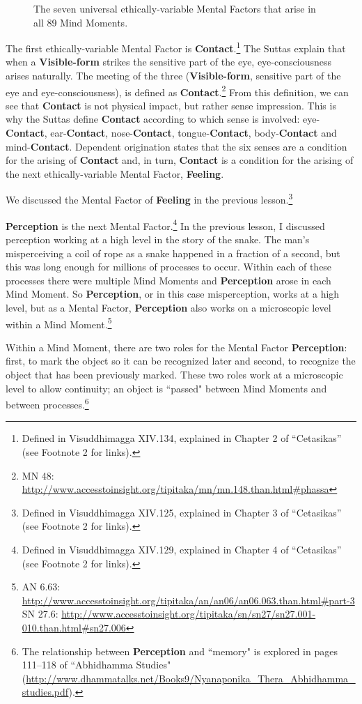 \begin{figure} [H]
\caption{The seven universal ethically-variable Mental Factors that arise in all 89 Mind Moments.}
\label{VarUni}
\end{figure}

The first ethically-variable Mental Factor is \textbf{Contact}.\footnote{Defined in Visuddhimagga XIV.134, explained in Chapter 2 of “Cetasikas” (see Footnote 2 for links).} The Suttas explain that when a \textbf{Visible-form} strikes the sensitive part of the eye, eye-consciousness arises naturally. The meeting of the three (\textbf{Visible-form}, sensitive part of the eye and eye-consciousness), is defined as \textbf{Contact}.\footnote{MN 48: \url{http://www.accesstoinsight.org/tipitaka/mn/mn.148.than.html\#phassa}} From this definition, we can see that \textbf{Contact} is not physical impact, but rather sense impression. This is why the Suttas define \textbf{Contact} according to which sense is involved: eye-\textbf{Contact}, ear-\textbf{Contact}, nose-\textbf{Contact}, tongue-\textbf{Contact}, body-\textbf{Contact} and mind-\textbf{Contact}. Dependent origination states that the six senses are a condition for the arising of \textbf{Contact} and, in turn, \textbf{Contact} is a condition for the arising of the next ethically-variable Mental Factor, \textbf{Feeling}.

We discussed the Mental Factor of \textbf{Feeling} in the previous lesson.\footnote{Defined in Visuddhimagga XIV.125, explained in Chapter 3 of “Cetasikas” (see Footnote 2 for links).}

\pagebreak

\textbf{Perception} is the next Mental Factor.\footnote{Defined in Visuddhimagga XIV.129, explained in Chapter 4 of “Cetasikas” (see Footnote 2 for links).} In the previous lesson, I discussed perception working at a high level in the story of the snake. The man's misperceiving a coil of rope as a snake happened in a fraction of a second, but this was long enough for millions of processes to occur. Within each of these processes there were multiple Mind Moments and \textbf{Perception} arose in each Mind Moment. So \textbf{Perception}, or in this case misperception, works at a high level, but as a Mental Factor, \textbf{Perception} also works on a microscopic level within a Mind Moment.\footnote{AN 6.63: \url{http://www.accesstoinsight.org/tipitaka/an/an06/an06.063.than.html\#part-3}\\SN 27.6: \url{http://www.accesstoinsight.org/tipitaka/sn/sn27/sn27.001-010.than.html\#sn27.006}}

Within a Mind Moment, there are two roles for the Mental Factor \textbf{Perception}: first, to mark the object so it can be recognized later and second, to recognize the object that has been previously marked. These two roles work at a microscopic level to allow continuity; an object is ``passed" between Mind Moments and between processes.\footnote{The relationship between \textbf{Perception} and “memory" is explored in pages 111--118 of “Abhidhamma Studies" (\url{http://www.dhammatalks.net/Books9/Nyanaponika_Thera_Abhidhamma_studies.pdf}).}

